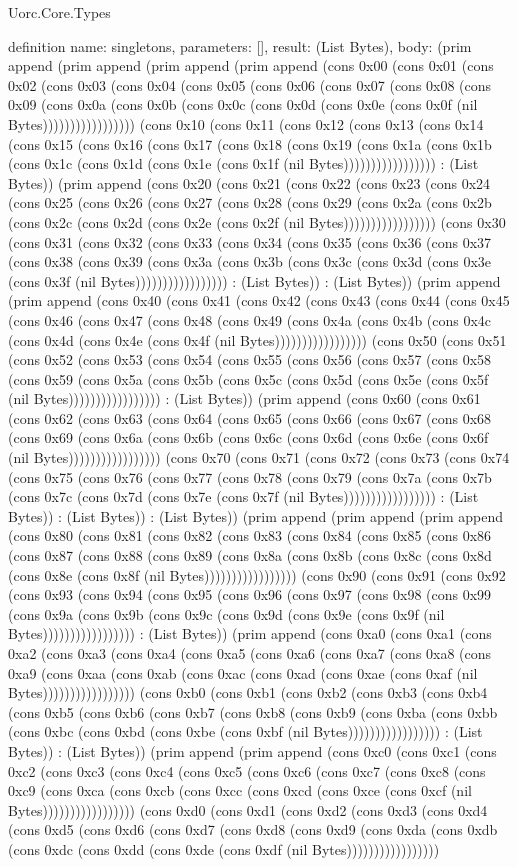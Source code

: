 \begin{lexlean}{Uorc.Core.Types}
\begin{semanticmodule}
definition{
  name: singletons,
  parameters: [],
  result: (List Bytes),
  body: (prim append (prim append (prim append (prim append (cons 0x00 (cons 0x01 (cons 0x02 (cons 0x03 (cons 0x04 (cons 0x05 (cons 0x06 (cons 0x07 (cons 0x08 (cons 0x09 (cons 0x0a (cons 0x0b (cons 0x0c (cons 0x0d (cons 0x0e (cons 0x0f (nil Bytes))))))))))))))))) (cons 0x10 (cons 0x11 (cons 0x12 (cons 0x13 (cons 0x14 (cons 0x15 (cons 0x16 (cons 0x17 (cons 0x18 (cons 0x19 (cons 0x1a (cons 0x1b (cons 0x1c (cons 0x1d (cons 0x1e (cons 0x1f (nil Bytes))))))))))))))))) : (List Bytes)) (prim append (cons 0x20 (cons 0x21 (cons 0x22 (cons 0x23 (cons 0x24 (cons 0x25 (cons 0x26 (cons 0x27 (cons 0x28 (cons 0x29 (cons 0x2a (cons 0x2b (cons 0x2c (cons 0x2d (cons 0x2e (cons 0x2f (nil Bytes))))))))))))))))) (cons 0x30 (cons 0x31 (cons 0x32 (cons 0x33 (cons 0x34 (cons 0x35 (cons 0x36 (cons 0x37 (cons 0x38 (cons 0x39 (cons 0x3a (cons 0x3b (cons 0x3c (cons 0x3d (cons 0x3e (cons 0x3f (nil Bytes))))))))))))))))) : (List Bytes)) : (List Bytes)) (prim append (prim append (cons 0x40 (cons 0x41 (cons 0x42 (cons 0x43 (cons 0x44 (cons 0x45 (cons 0x46 (cons 0x47 (cons 0x48 (cons 0x49 (cons 0x4a (cons 0x4b (cons 0x4c (cons 0x4d (cons 0x4e (cons 0x4f (nil Bytes))))))))))))))))) (cons 0x50 (cons 0x51 (cons 0x52 (cons 0x53 (cons 0x54 (cons 0x55 (cons 0x56 (cons 0x57 (cons 0x58 (cons 0x59 (cons 0x5a (cons 0x5b (cons 0x5c (cons 0x5d (cons 0x5e (cons 0x5f (nil Bytes))))))))))))))))) : (List Bytes)) (prim append (cons 0x60 (cons 0x61 (cons 0x62 (cons 0x63 (cons 0x64 (cons 0x65 (cons 0x66 (cons 0x67 (cons 0x68 (cons 0x69 (cons 0x6a (cons 0x6b (cons 0x6c (cons 0x6d (cons 0x6e (cons 0x6f (nil Bytes))))))))))))))))) (cons 0x70 (cons 0x71 (cons 0x72 (cons 0x73 (cons 0x74 (cons 0x75 (cons 0x76 (cons 0x77 (cons 0x78 (cons 0x79 (cons 0x7a (cons 0x7b (cons 0x7c (cons 0x7d (cons 0x7e (cons 0x7f (nil Bytes))))))))))))))))) : (List Bytes)) : (List Bytes)) : (List Bytes)) (prim append (prim append (prim append (cons 0x80 (cons 0x81 (cons 0x82 (cons 0x83 (cons 0x84 (cons 0x85 (cons 0x86 (cons 0x87 (cons 0x88 (cons 0x89 (cons 0x8a (cons 0x8b (cons 0x8c (cons 0x8d (cons 0x8e (cons 0x8f (nil Bytes))))))))))))))))) (cons 0x90 (cons 0x91 (cons 0x92 (cons 0x93 (cons 0x94 (cons 0x95 (cons 0x96 (cons 0x97 (cons 0x98 (cons 0x99 (cons 0x9a (cons 0x9b (cons 0x9c (cons 0x9d (cons 0x9e (cons 0x9f (nil Bytes))))))))))))))))) : (List Bytes)) (prim append (cons 0xa0 (cons 0xa1 (cons 0xa2 (cons 0xa3 (cons 0xa4 (cons 0xa5 (cons 0xa6 (cons 0xa7 (cons 0xa8 (cons 0xa9 (cons 0xaa (cons 0xab (cons 0xac (cons 0xad (cons 0xae (cons 0xaf (nil Bytes))))))))))))))))) (cons 0xb0 (cons 0xb1 (cons 0xb2 (cons 0xb3 (cons 0xb4 (cons 0xb5 (cons 0xb6 (cons 0xb7 (cons 0xb8 (cons 0xb9 (cons 0xba (cons 0xbb (cons 0xbc (cons 0xbd (cons 0xbe (cons 0xbf (nil Bytes))))))))))))))))) : (List Bytes)) : (List Bytes)) (prim append (prim append (cons 0xc0 (cons 0xc1 (cons 0xc2 (cons 0xc3 (cons 0xc4 (cons 0xc5 (cons 0xc6 (cons 0xc7 (cons 0xc8 (cons 0xc9 (cons 0xca (cons 0xcb (cons 0xcc (cons 0xcd (cons 0xce (cons 0xcf (nil Bytes))))))))))))))))) (cons 0xd0 (cons 0xd1 (cons 0xd2 (cons 0xd3 (cons 0xd4 (cons 0xd5 (cons 0xd6 (cons 0xd7 (cons 0xd8 (cons 0xd9 (cons 0xda (cons 0xdb (cons 0xdc (cons 0xdd (cons 0xde (cons 0xdf (nil Bytes))))))))))))))))) }
\end{semanticmodule}
\end{lexlean}
